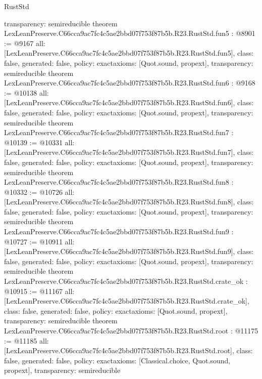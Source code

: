 \begin{lexlean}{RustStd}
\begin{coremodule}
{  transparency: semireducible
}
theorem LexLeanPreserve.C66cca9ac7fc4c5ae2bbd07f753f87b5b.R23.RustStd.fun5 : @8901 := @9167 {
  all: [LexLeanPreserve.C66cca9ac7fc4c5ae2bbd07f753f87b5b.R23.RustStd.fun5],
  class: false,
  generated: false,
  policy: exact{axioms: [Quot.sound, propext]},
  transparency: semireducible
}
theorem LexLeanPreserve.C66cca9ac7fc4c5ae2bbd07f753f87b5b.R23.RustStd.fun6 : @9168 := @10138 {
  all: [LexLeanPreserve.C66cca9ac7fc4c5ae2bbd07f753f87b5b.R23.RustStd.fun6],
  class: false,
  generated: false,
  policy: exact{axioms: [Quot.sound, propext]},
  transparency: semireducible
}
theorem LexLeanPreserve.C66cca9ac7fc4c5ae2bbd07f753f87b5b.R23.RustStd.fun7 : @10139 := @10331 {
  all: [LexLeanPreserve.C66cca9ac7fc4c5ae2bbd07f753f87b5b.R23.RustStd.fun7],
  class: false,
  generated: false,
  policy: exact{axioms: [Quot.sound, propext]},
  transparency: semireducible
}
theorem LexLeanPreserve.C66cca9ac7fc4c5ae2bbd07f753f87b5b.R23.RustStd.fun8 : @10332 := @10726 {
  all: [LexLeanPreserve.C66cca9ac7fc4c5ae2bbd07f753f87b5b.R23.RustStd.fun8],
  class: false,
  generated: false,
  policy: exact{axioms: [Quot.sound, propext]},
  transparency: semireducible
}
theorem LexLeanPreserve.C66cca9ac7fc4c5ae2bbd07f753f87b5b.R23.RustStd.fun9 : @10727 := @10911 {
  all: [LexLeanPreserve.C66cca9ac7fc4c5ae2bbd07f753f87b5b.R23.RustStd.fun9],
  class: false,
  generated: false,
  policy: exact{axioms: [Quot.sound, propext]},
  transparency: semireducible
}
theorem LexLeanPreserve.C66cca9ac7fc4c5ae2bbd07f753f87b5b.R23.RustStd.crate_ok : @10915 := @11167 {
  all: [LexLeanPreserve.C66cca9ac7fc4c5ae2bbd07f753f87b5b.R23.RustStd.crate_ok],
  class: false,
  generated: false,
  policy: exact{axioms: [Quot.sound, propext]},
  transparency: semireducible
}
theorem LexLeanPreserve.C66cca9ac7fc4c5ae2bbd07f753f87b5b.R23.RustStd.root : @11175 := @11185 {
  all: [LexLeanPreserve.C66cca9ac7fc4c5ae2bbd07f753f87b5b.R23.RustStd.root],
  class: false,
  generated: false,
  policy: exact{axioms: [Classical.choice, Quot.sound, propext]},
  transparency: semireducible
}


\end{coremodule}
\end{lexlean}
